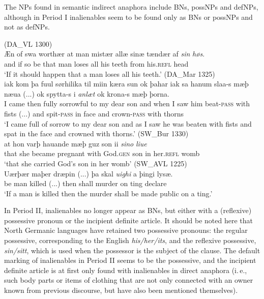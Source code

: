 \documentclass[output=paper]{langsci/langscibook}
\begin{document}
\hspace*{-1mm}The NPs found in semantic indirect anaphora include BNs, possNPs and defNPs, although in Period I inalienables seem to be found only as BNs or possNPs and not as defNPs.

\begin{exe}
\ex\label{6ex:19}
(DA\_VL 1300)\\
\gll Æn of swa {worthær} at man {mistær} allæ sinæ {tændær} af {\emph{sin}} {\emph{høs}}.\\
%
and if so be {that} man loses all his teeth {from} {his.{\textsc{refl}}} head \\
%
\glt `If it should happen that a man loses all his teeth.'
\ex\label{6ex:20}
(DA\_Mar 1325)\\
\gll iak kom þa fuul sørhilika til miin kæra sun ok þahar iak sa hanum slaa-s mæþ næua (...) ok spytta-s i {\emph{anlæt}} ok krona-s mæþ þorna. \\
%
I came then fully sorrowful to my dear son and when I saw him beat-{\textsc{pass}} with fists (...) and spit-{\textsc{pass}} in face and crown-{\textsc{pass}} with thorns \\
%
\glt `I came full of sorrow to my dear son and as I saw he was beaten with fists and spat in the face and crowned with thorns.' 
\ex\label{6ex:21}
(SW\_Bur 1330)\\
\gll at hon varþ hauande mæþ guz son ii {\emph{sino}} {\emph{liue}}\\
that she became pregnant with God.{\textsc{gen}} son in her.{\textsc{refl}} womb\\
\glt `that she carried God's son in her womb'
\ex\label{6ex:22}
(SW\_AVL 1225)\\
\gll Uærþær maþer dræpin (...) þa skal {\emph{uighi}} a þingi lysæ. \\
be man killed (...) then shall murder on ting declare \\
\glt `If a man is killed then the murder shall be made public on a ting.' \\
\end{exe}

{
In Period II, inalienables no longer appear as BNs, but either with a (reflexive) possessive pronoun or the incipient definite article. It should be noted here that North Germanic languages have retained two possessive pronouns: the regular possessive, corresponding to the English {\emph{his/her/its}}, and the reflexive possessive, {\emph{sin/sitt}}, which is used when the possessor is the subject of the clause. The default marking of inalienables in Period II seems to be the possessive, and the incipient definite article is at first only found with inalienables in direct anaphora (i.\,e., such body parts or items of clothing that are not only connected with an owner known from previous discourse, but have also been mentioned themselves).
}
\end{document}

